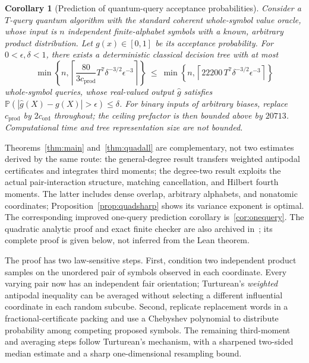 \documentclass[11pt]{article}
\numberwithin{equation}{section}
\newtheorem{corollary}[theorem]{Corollary}
\theoremstyle{remark}
\newcommand{\Prb}{\mathbb P}
\newcommand{\cprod}{c_{\mathrm{prod}}}
\newcommand{\cord}{c_{\mathrm{ord}}}
\begin{document}
\begin{corollary}[Prediction of quantum-query acceptance probabilities]\label{cor:quantum}
Consider a $T$-query quantum algorithm with the standard coherent whole-symbol value oracle, whose input is $n$ independent finite-alphabet symbols with a known, arbitrary product distribution. Let $g(x)\in[0,1]$ be its acceptance probability. For $0<\epsilon,\delta<1$, there exists a deterministic classical decision tree with at most
\begin{equation}\label{eq:quantum}
 \min\left\{n,\left\lceil\frac{80}{3\cprod}
 T^7\delta^{-3/2}\epsilon^{-3}\right\rceil\right\}
 \ \le\ \min\left\{n,\left\lceil 22200\,T^7\delta^{-3/2}\epsilon^{-3}\right\rceil\right\}
\end{equation}
whole-symbol queries, whose real-valued output $\widehat g$ satisfies
$\Prb(|\widehat g(X)-g(X)|>\epsilon)\le\delta$.
For binary inputs of arbitrary biases, replace $\cprod$ by $2\cord$ throughout; the ceiling prefactor is then bounded above by $20713$. Computational time and tree representation size are not bounded.
\end{corollary}

Theorems~\ref{thm:main} and~\ref{thm:quadall} are complementary, not two estimates derived by the same route: the general-degree result transfers weighted antipodal certificates and integrates third moments; the degree-two result exploits the actual pair-interaction structure, matching cancellation, and Hilbert fourth moments. The latter includes dense overlap, arbitrary alphabets, and nonatomic coordinates; Proposition~\ref{prop:quadsharp} shows its variance exponent is optimal. The corresponding improved one-query prediction corollary is~\ref{cor:onequery}. The quadratic analytic proof and exact finite checker are also archived in~\cite{WriQuad26}; its complete proof is given below, not inferred from the Lean theorem.

The proof has two law-sensitive steps. First, condition two independent product samples on the unordered pair of symbols observed in each coordinate. Every varying pair now has an independent fair orientation; Turturean's \emph{weighted} antipodal inequality can be averaged without selecting a different influential coordinate in each random subcube. Second, replicate replacement words in a fractional-certificate packing and use a Chebyshev polynomial to distribute probability among competing proposed symbols. The remaining third-moment and averaging steps follow Turturean's mechanism, with a sharpened two-sided median estimate and a sharp one-dimensional resampling bound.
\end{document}
